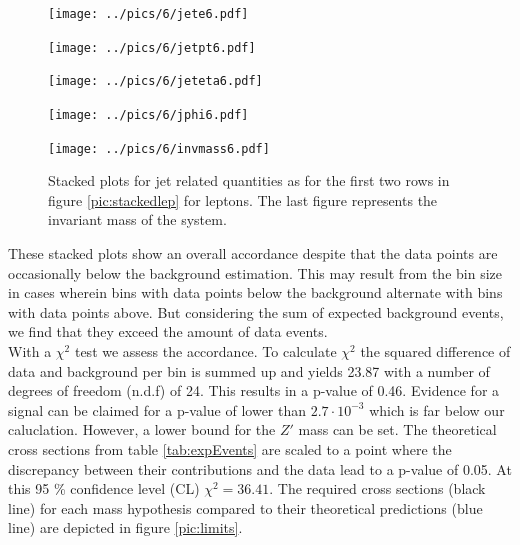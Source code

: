 \begin{figure}
\begin{minipage}{\minwidththree\textwidth}
 \texttt{[image: ../pics/6/jete6.pdf]}
\end{minipage}
\begin{minipage}{\minwidththree\textwidth}
 \texttt{[image: ../pics/6/jetpt6.pdf]}
\end{minipage}


\begin{minipage}{\minwidththree\textwidth}
 \texttt{[image: ../pics/6/jeteta6.pdf]}
\end{minipage}
\begin{minipage}{\minwidththree\textwidth}
 \texttt{[image: ../pics/6/jphi6.pdf]}
\end{minipage}


\begin{minipage}{0.8\textwidth}
 \texttt{[image: ../pics/6/invmass6.pdf]}
\end{minipage}
\caption{\small{Stacked plots for jet related quantities as for the first two rows in figure \ref{pic:stackedlep} for leptons. The last figure represents
the invariant mass of the system. }}
\label{pic:stackedjet} 
\end{figure}
These stacked plots show an overall accordance despite that the data points are occasionally below the background estimation. This may result from 
the bin size in cases wherein bins with data points below the background alternate with bins with data points above. But considering the sum of
expected background events, we find that they exceed the amount of data events. \\
\noindent With a $\chi^2$ test we assess the accordance. To calculate $\chi^2$ the squared difference of data and background per bin is summed up
and yields 23.87 with a number of degrees of freedom (n.d.f) of 24. This results in a p-value of 0.46. Evidence for a signal can be claimed
for a p-value of lower than $2.7\cdot 10^{-3}$ which is far below our caluclation. However, a lower bound for the $Z'$ mass can be set. The 
theoretical cross sections from table \ref{tab:expEvents} are scaled to a point where the discrepancy between their contributions and the data
lead to a p-value of 0.05. At this 95 \% confidence level (CL) $\chi^2 = 36.41$. The required cross sections (black line) for each mass hypothesis 
compared to their theoretical predictions (blue line) are depicted in figure \ref{pic:limits}.
